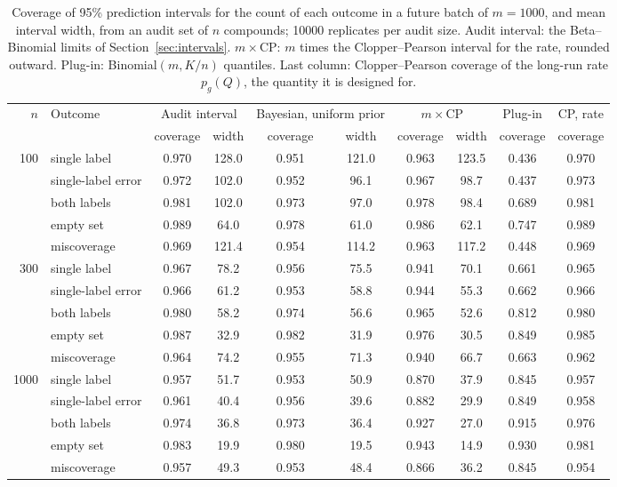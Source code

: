\begin{table}[ht]
\centering
\caption{Coverage of 95\% prediction intervals for the count of each outcome in a future batch of $m=1000$, and mean interval width, from an audit set of $n$ compounds; 10000 replicates per audit size. Audit interval: the Beta--Binomial limits of Section~\ref{sec:intervals}. $m\times$CP: $m$ times the Clopper--Pearson interval for the rate, rounded outward. Plug-in: Binomial$(m,K/n)$ quantiles. Last column: Clopper--Pearson coverage of the long-run rate $p_g(Q)$, the quantity it is designed for.}
\label{tab:validation}
\small
\begin{tabular}{rlcccccccc}
\toprule
$n$ & Outcome & \multicolumn{2}{c}{Audit interval} & \multicolumn{2}{c}{Bayesian, uniform prior} & \multicolumn{2}{c}{$m\times$CP} & Plug-in & CP, rate \\
 & & coverage & width & coverage & width & coverage & width & coverage & coverage \\
\midrule
100 & single label & 0.970 & 128.0 & 0.951 & 121.0 & 0.963 & 123.5 & 0.436 & 0.970 \\
 & single-label error & 0.972 & 102.0 & 0.952 & 96.1 & 0.967 & 98.7 & 0.437 & 0.973 \\
 & both labels & 0.981 & 102.0 & 0.973 & 97.0 & 0.978 & 98.4 & 0.689 & 0.981 \\
 & empty set & 0.989 & 64.0 & 0.978 & 61.0 & 0.986 & 62.1 & 0.747 & 0.989 \\
 & miscoverage & 0.969 & 121.4 & 0.954 & 114.2 & 0.963 & 117.2 & 0.448 & 0.969 \\
300 & single label & 0.967 & 78.2 & 0.956 & 75.5 & 0.941 & 70.1 & 0.661 & 0.965 \\
 & single-label error & 0.966 & 61.2 & 0.953 & 58.8 & 0.944 & 55.3 & 0.662 & 0.966 \\
 & both labels & 0.980 & 58.2 & 0.974 & 56.6 & 0.965 & 52.6 & 0.812 & 0.980 \\
 & empty set & 0.987 & 32.9 & 0.982 & 31.9 & 0.976 & 30.5 & 0.849 & 0.985 \\
 & miscoverage & 0.964 & 74.2 & 0.955 & 71.3 & 0.940 & 66.7 & 0.663 & 0.962 \\
1000 & single label & 0.957 & 51.7 & 0.953 & 50.9 & 0.870 & 37.9 & 0.845 & 0.957 \\
 & single-label error & 0.961 & 40.4 & 0.956 & 39.6 & 0.882 & 29.9 & 0.849 & 0.958 \\
 & both labels & 0.974 & 36.8 & 0.973 & 36.4 & 0.927 & 27.0 & 0.915 & 0.976 \\
 & empty set & 0.983 & 19.9 & 0.980 & 19.5 & 0.943 & 14.9 & 0.930 & 0.981 \\
 & miscoverage & 0.957 & 49.3 & 0.953 & 48.4 & 0.866 & 36.2 & 0.845 & 0.954 \\
\bottomrule
\end{tabular}
\end{table}
